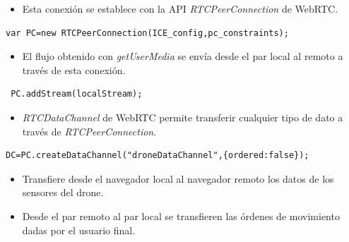 \documentclass[notes,slidesec,a4]{seminar}
\begin{document}

\begin{hslide}
\begin{itemize}
\item Esta conexión se establece con la API \emph{RTCPeerConnection} de WebRTC.
\end{itemize}
\lstset{}
\begin{lstlisting}
var PC=new RTCPeerConnection(ICE_config,pc_constraints);
\end{lstlisting}

\begin{itemize}
\item El flujo obtenido con \emph{getUserMedia} se envía desde el par local al remoto a través de esta conexión.
\end{itemize}
\lstset{}
\begin{lstlisting}
 PC.addStream(localStream);
\end{lstlisting}
\end{hslide}


\begin{hslide}
\begin{itemize}
\item \emph{RTCDataChannel} de WebRTC permite transferir cualquier tipo de dato a través de \emph{RTCPeerConnection}.
\end{itemize}
\lstset{}
\begin{lstlisting}
DC=PC.createDataChannel("droneDataChannel",{ordered:false});
\end{lstlisting}

\begin{itemize}
\item Transfiere desde el navegador local al navegador remoto los datos de los sensores del drone.
\item Desde el par remoto al par local se transfieren las órdenes de movimiento dadas por el usuario final.
\end{itemize}
\end{hslide}


\end{document}
